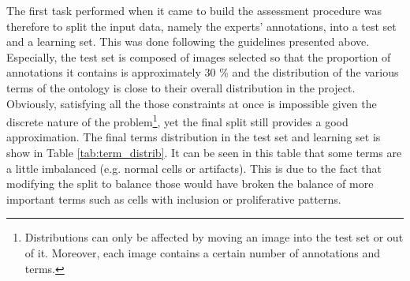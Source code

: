 The first task performed when it came to build the assessment procedure was therefore to split the input data, namely the experts' annotations, into a test set and a learning set. This was done following the guidelines presented above. Especially, the test set is composed of images selected so that the proportion of annotations it contains is approximately 30 \% and the distribution of the various terms of the ontology is close to their overall distribution in the project. Obviously, satisfying all the those constraints at once is impossible given the discrete nature of the problem\footnote{Distributions can only be affected by moving an image into the test set or out of it. Moreover, each image contains a certain number of annotations and terms.}, yet the final split still provides a good approximation. The final terms distribution in the test set and learning set is show in Table \ref{tab:term_distrib}. It can be seen in this table that some terms are a little imbalanced (e.g. normal cells or artifacts). This is due to the fact that modifying the split to balance those would have broken the balance of more important terms such as cells with inclusion or proliferative patterns. 


